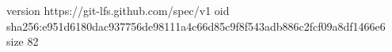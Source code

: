 version https://git-lfs.github.com/spec/v1
oid sha256:e951d6180dac937756de98111a4c66d85c9f8f543adb886c2fcf09a8df1466e6
size 82
